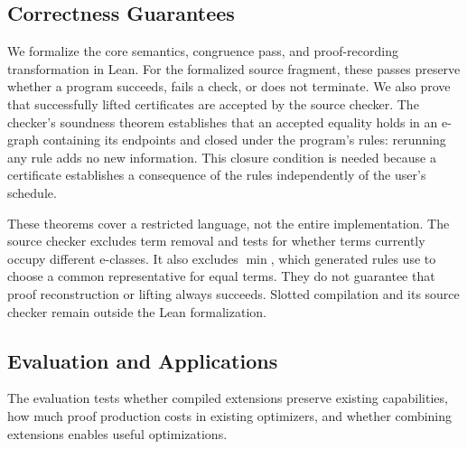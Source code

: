 \subsection{Correctness Guarantees}
\label{sec:extension-correctness}

We formalize the core semantics, congruence pass, and proof-recording transformation in Lean.
For the formalized source fragment, these passes preserve
  whether a program succeeds, fails a check, or does not terminate.
We also prove that successfully lifted certificates are accepted by the source checker.
The checker's soundness theorem establishes that an accepted equality holds
  in an e-graph containing its endpoints and closed under the program's rules:
  rerunning any rule adds no new information.
This closure condition is needed because a certificate establishes a consequence
  of the rules independently of the user's schedule.

These theorems cover a restricted language, not the entire implementation.
The source checker excludes term removal and tests for whether terms currently occupy different e-classes.
It also excludes $\min$, which generated rules use to choose a common representative for equal terms.
They do not guarantee that proof reconstruction or lifting always succeeds.
Slotted compilation and its source checker remain outside the Lean formalization.

\subsection{Evaluation and Applications}
\label{sec:extension-evaluation}

The evaluation tests whether compiled extensions preserve existing capabilities,
  how much proof production costs in existing optimizers,
  and whether combining extensions enables useful optimizations.

